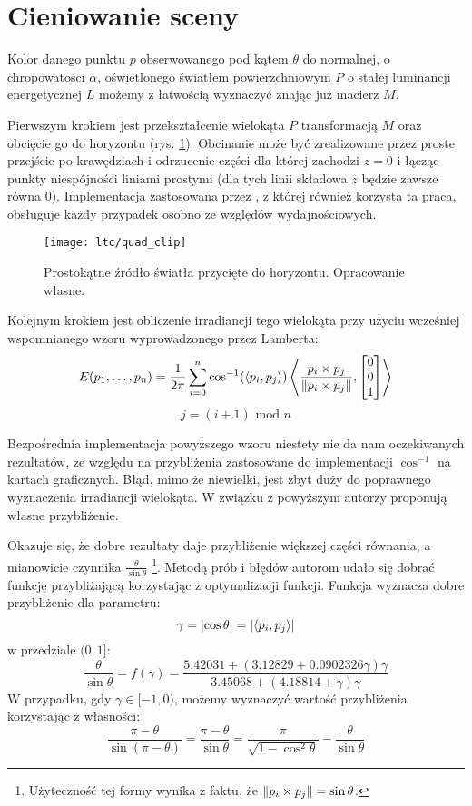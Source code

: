 \documentclass[../main.tex]{subfiles}
\begin{document}
\section{Cieniowanie sceny}

Kolor danego punktu $p$ obserwowanego pod kątem $\theta$ do normalnej, o chropowatości $\alpha$, oświetlonego światłem powierzchniowym $P$ o stałej luminancji energetycznej $L$ możemy z łatwością wyznaczyć znając już macierz $M$.

Pierwszym krokiem jest przekształcenie wielokąta $P$ transformacją $M$ oraz obcięcie go do horyzontu (rys. \ref{fig:QuadClip}). Obcinanie może być zrealizowane przez proste przejście po krawędziach i odrzucenie części dla której zachodzi $z=0$ i łącząc punkty niespójności liniami prostymi (dla tych linii składowa $z$ będzie zawsze równa $0$). Implementacja zastosowana przez \cite{ltc_heitz}, z której również korzysta ta praca, obsługuje każdy przypadek osobno ze względów wydajnościowych.

\begin{figure}[h]
    \centering
    \texttt{[image: ltc/quad\_clip]}
    \caption{Prostokątne źródło światła przycięte do horyzontu. Opracowanie własne.}
    \label{fig:QuadClip}
\end{figure}

Kolejnym krokiem jest obliczenie irradiancji tego wielokąta przy użyciu wcześniej wspomnianego wzoru wyprowadzonego przez Lamberta:
\[
E(p_1, \ldots, p_n) =
\frac{1}{2\pi}
\sum_{i=0}^{n} {
    \cos^{-1}(\langle p_i, p_j \rangle)
    \left\langle {
        \frac{p_i \times p_j}{\norm{p_i \times p_j}},
        \left[ \begin{matrix} 0 \\ 0 \\ 1 \end{matrix} \right]
    } \right\rangle
}
\]
\[
j = (i+1) \text{ mod } n
\]

Bezpośrednia implementacja powyższego wzoru niestety nie da nam oczekiwanych rezultatów, ze względu na przybliżenia zastosowane do implementacji $\cos^{-1}$ na kartach graficznych. Błąd, mimo że niewielki, jest zbyt duży do poprawnego wyznaczenia irradiancji wielokąta. W związku z powyższym autorzy \cite{LTCJourneyPresentation} proponują własne przybliżenie.

Okazuje się, że dobre rezultaty daje przybliżenie większej części równania, a mianowicie czynnika $\frac{\theta}{\sin\theta}$ \footnote{Użyteczność tej formy wynika z faktu, że $\norm{p_i \times p_j} = \sin\theta$.}. Metodą prób i błędów autorom udało się dobrać funkcję przybliżającą korzystając z optymalizacji funkcji. Funkcja wyznacza dobre przybliżenie dla parametru:
\[
\gamma = \abs{\cos\theta} = \abs{\langle p_i, p_j \rangle}
\]
\noindent w przedziale $(0,1]$:
\[
\frac{\theta}{\sin\theta} = f(\gamma) = \frac{
    5.42031 + \left( 3.12829 + 0.0902326 \gamma \right) \gamma
}{
    3.45068 + \left( 4.18814 + \gamma \right) \gamma
}
\]
\noindent W przypadku, gdy $\gamma \in [-1, 0)$, możemy wyznaczyć wartość przybliżenia korzystając z własności:
\[
    \frac{\pi - \theta}{\sin\left( \pi-\theta \right)} =
    \frac{\pi - \theta}{\sin\theta} = 
    \frac{\pi}{\sqrt{1-\cos^{2}\theta}} - \frac{\theta}{\sin\theta}
\]
\end{document}
